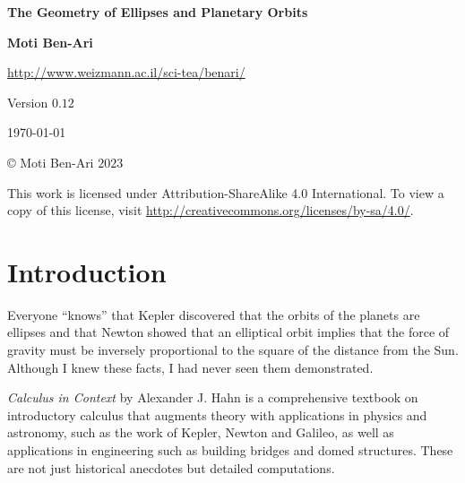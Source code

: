 


\thispagestyle{empty}

\begin{center}
\textbf{\LARGE The Geometry of Ellipses and Planetary Orbits}

\bigskip
\bigskip
\bigskip

\textbf{\Large Moti Ben-Ari}

\bigskip

\url{http://www.weizmann.ac.il/sci-tea/benari/}

\bigskip
\bigskip
\bigskip

Version $0.12$

\bigskip

\today

\end{center}

\vfill

\begin{center}
\copyright{} Moti Ben-Ari $2023$
\end{center}
 
\begin{small}
This work is licensed under Attribution-ShareAlike 4.0 International. To view a copy of this license, visit \url{http://creativecommons.org/licenses/by-sa/4.0/}.
\end{small}

\newpage

\tableofcontents

\newpage


\section{Introduction}

Everyone ``knows'' that Kepler discovered that the orbits of the planets are ellipses and that Newton showed that an elliptical orbit implies that the force of gravity must be inversely proportional to the square of the distance from the Sun. Although I knew these facts, I had never seen them demonstrated.

\textit{Calculus in Context} \cite{hahn-cic} by Alexander J. Hahn is a comprehensive textbook on introductory calculus that augments theory with  applications in physics and astronomy, such as the work of Kepler, Newton and Galileo, as well as applications in engineering such as building bridges and domed structures. These are not just historical anecdotes but detailed computations.

